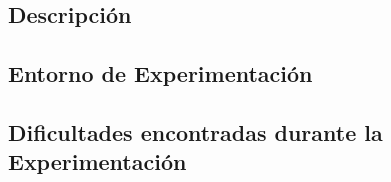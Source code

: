 \subsection{Descripci\'on}


\subsection{Entorno de Experimentaci\'on}


\subsection{Dificultades encontradas durante la Experimentaci\'on}



